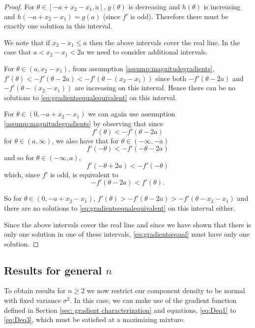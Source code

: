 \begin{proof}
			For $\theta \in [-a + x_2 - x_1, a]$, $g(\theta)$ is decreasing and $h(\theta)$ is increasing and $h(-a +x_2 -x_1) = g(a)$ (since $f'$ is odd). Therefore there must be exactly one solution in this interval.
			
			We note that if $x_2 - x_1 \leq a$ then the above intervals cover the real line. In the case that $a <x_2 - x_1 < 2a$ we need to consider additional intervals.

			For $\theta \in (a,x_2 - x_1)$, from assumption \ref{assump:magnitudegradients}, $f'(\theta) < -f'(\theta - 2a) < -f'(\theta - (x_2 - x_1))$ since both $-f'(\theta - 2a)$ and $-f'(\theta - (x_2 - x_1))$ are increasing on this interval. Hence there can be no solutions to \eqref{eq:gradientsequalequivalent} on this interval.
			
			For $\theta \in (0, -a+x_2 - x_1)$ we can again use assumption \ref{assump:magnitudegradients} by observing that since 
			\begin{equation}
				f'(\theta) < -f'(\theta - 2a)
			\end{equation}
			for $\theta \in (a, \infty)$, we also have that for $\theta \in (-\infty, -a)$
			\begin{equation}
				f'(-\theta) < -f'(-\theta - 2a)
			\end{equation}
			and so for $\theta \in (-\infty, a)$,
			\begin{equation}
				f'(-\theta + 2a) < -f'(-\theta)
			\end{equation}
			which, since $f'$ is odd, is equivalent to 
			\begin{equation}
				-f'(\theta - 2a) < f'(\theta).
			\end{equation}

			So for $\theta \in (0,-a+x_2-x_1)$,  $f'(\theta)>-f'(\theta - 2a) > -f'(\theta - x_2 - x_1)$ and there are no solutions to \eqref{eq:gradientsequalequivalent} on this interval either.
			
			Since the above intervals cover the real line and since we have shown that there is only one solution in one of these intervals, \eqref{eq:gradientsequal} must have only one solution.
		\end{proof}

	\subsection{Results for general \texorpdfstring{$n$}{n}}
	\label{sec: results for general n}
	To obtain results for $n \geq 2$ we now restrict our component density to be normal with fixed variance $\sigma^2$. In this case, we can make use of the gradient function defined in Section \ref{sec: gradient characterization} and equations, \eqref{eq:Deq1} to \eqref{eq:Deq3}, which must be satisfied at a maximizing mixture.

